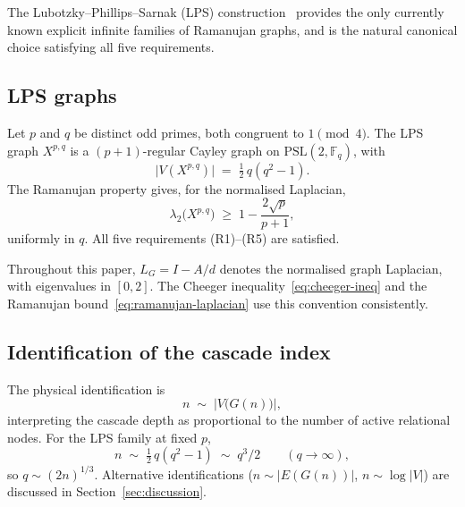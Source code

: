     The Lubotzky--Phillips--Sarnak (LPS) construction~\cite{LPS1988} provides the
    only currently known explicit infinite families of Ramanujan graphs, and is
    the natural canonical choice satisfying all five requirements.

  \subsection{LPS graphs}
    \label{sec:model:lps}

    Let $p$ and $q$ be distinct odd primes, both congruent to $1 \pmod{4}$.
    The LPS graph $X^{p,q}$ is a $(p+1)$-regular Cayley graph on
    $\mathrm{PSL}(2, \mathbb{F}_q)$, with
    \begin{equation}
      \label{eq:lps-order}
      \bigl|V(X^{p,q})\bigr|
      \;=\; \tfrac{1}{2}\,q(q^2 - 1).
    \end{equation}
    The Ramanujan property gives, for the normalised Laplacian,
    \begin{equation}
      \label{eq:ramanujan-laplacian}
      \lambda_2\bigl(X^{p,q}\bigr)
      \;\geq\; 1 - \frac{2\sqrt{p}}{p+1},
    \end{equation}
    uniformly in $q$.
    All five requirements (R1)--(R5) are satisfied.

    \begin{remark}
  Throughout this paper, $L_G = I - A/d$ denotes the normalised graph
  Laplacian, with eigenvalues in $[0,2]$.
  The Cheeger inequality~\eqref{eq:cheeger-ineq} and the Ramanujan
  bound~\eqref{eq:ramanujan-laplacian} use this convention consistently.
    \end{remark}

  \subsection{Identification of the cascade index}
    \label{sec:model:index}

    The physical identification is
    \begin{equation}
      \label{eq:index-id}
      n \;\sim\; \bigl|V\bigl(G(n)\bigr)\bigr|,
    \end{equation}
    interpreting the cascade depth as proportional to the number of active
    relational nodes.
    For the LPS family at fixed $p$,
    \begin{equation}
      \label{eq:index-lps}
      n \;\sim\; \tfrac{1}{2}\,q(q^2 - 1) \;\sim\; q^3/2
      \qquad (q \to \infty),
    \end{equation}
    so $q \sim (2n)^{1/3}$.
    Alternative identifications ($n \sim |E(G(n))|$, $n \sim \log|V|$) are
    discussed in Section~\ref{sec:discussion}.
